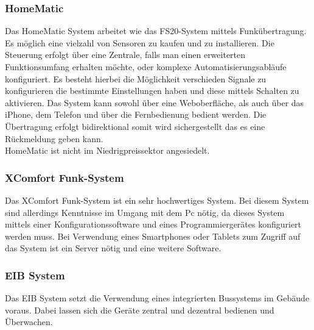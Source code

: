 \subsubsection{HomeMatic}
Das HomeMatic System arbeitet wie das FS20-System mittels Funkübertragung. Es möglich eine vielzahl von Sensoren zu kaufen und zu installieren. Die Steuerung erfolgt über eine 
Zentrale, falls man einen erweiterten Funktionsumfang erhalten möchte, oder komplexe Automatisierungsabläufe konfiguriert. Es besteht hierbei die Möglichkeit verschieden Signale zu konfigurieren die bestimmte Einstellungen haben und diese mittels Schalten zu aktivieren. 
Das System kann sowohl über eine Weboberfläche, als auch über das iPhone, dem Telefon und über die Fernbedienung bedient werden. Die Übertragung erfolgt bidirektional somit wird sichergestellt das es eine Rückmeldung geben kann.
\\
HomeMatic ist nicht im Niedrigpreissektor angesiedelt.

\subsubsection{XComfort Funk-System}
Das XComfort Funk-System ist ein sehr hochwertiges System. 
Bei diesem System sind allerdings Kenntnisse im Umgang mit dem Pc nötig, da dieses System mittels einer Konfigurationssoftware und eines 
Programmiergerätes konfiguriert werden muss. Bei Verwendung eines Smartphones oder Tablets zum Zugriff auf das System ist ein Server nötig und eine weitere Software.

\subsubsection{EIB System}
Das EIB System setzt die Verwendung eines integrierten Bussystems im Gebäude voraus. Dabei lassen sich die Geräte zentral und dezentral bedienen und Überwachen. 

